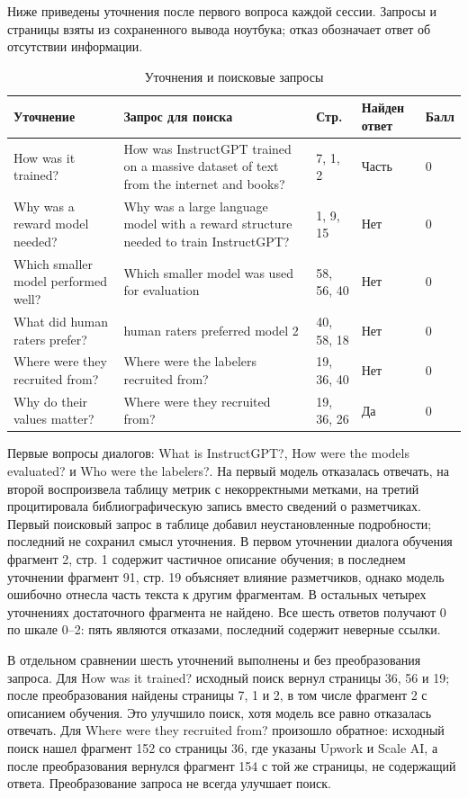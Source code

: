 \documentclass[12pt,a4paper]{article}
\begin{document}
Ниже приведены уточнения после первого вопроса каждой сессии. Запросы и страницы взяты из сохраненного вывода ноутбука; отказ обозначает ответ об отсутствии информации.
\begin{table}[H]\centering\small
\caption{Уточнения и поисковые запросы}
\begin{tabular}{L{3cm}L{5.3cm}L{1.4cm}L{1.6cm}L{1cm}}\toprule
Уточнение & Запрос для поиска & Стр. & Найден ответ & Балл\\\midrule
How was it trained? & How was InstructGPT trained on a massive dataset of text from the internet and books? & 7, 1, 2 & Часть & 0\\
Why was a reward model needed? & Why was a large language model with a reward structure needed to train InstructGPT? & 1, 9, 15 & Нет & 0\\
Which smaller model performed well? & Which smaller model was used for evaluation & 58, 56, 40 & Нет & 0\\
What did human raters prefer? & human raters preferred model 2 & 40, 58, 18 & Нет & 0\\
Where were they recruited from? & Where were the labelers recruited from? & 19, 36, 40 & Нет & 0\\
Why do their values matter? & Where were they recruited from? & 19, 36, 26 & Да & 0\\\bottomrule
\end{tabular}\end{table}
Первые вопросы диалогов: What is InstructGPT?, How were the models evaluated? и Who were the labelers?. На первый модель отказалась отвечать, на второй воспроизвела таблицу метрик с некорректными метками, на третий процитировала библиографическую запись вместо сведений о разметчиках. Первый поисковый запрос в таблице добавил неустановленные подробности; последний не сохранил смысл уточнения. В первом уточнении диалога обучения фрагмент 2, стр. 1 содержит частичное описание обучения; в последнем уточнении фрагмент 91, стр. 19 объясняет влияние разметчиков, однако модель ошибочно отнесла часть текста к другим фрагментам. В остальных четырех уточнениях достаточного фрагмента не найдено. Все шесть ответов получают 0 по шкале 0--2: пять являются отказами, последний содержит неверные ссылки.

В отдельном сравнении шесть уточнений выполнены и без преобразования запроса. Для How was it trained? исходный поиск вернул страницы 36, 56 и 19; после преобразования найдены страницы 7, 1 и 2, в том числе фрагмент 2 с описанием обучения. Это улучшило поиск, хотя модель все равно отказалась отвечать. Для Where were they recruited from? произошло обратное: исходный поиск нашел фрагмент 152 со страницы 36, где указаны Upwork и Scale AI, а после преобразования вернулся фрагмент 154 с той же страницы, не содержащий ответа. Преобразование запроса не всегда улучшает поиск.
\end{document}
